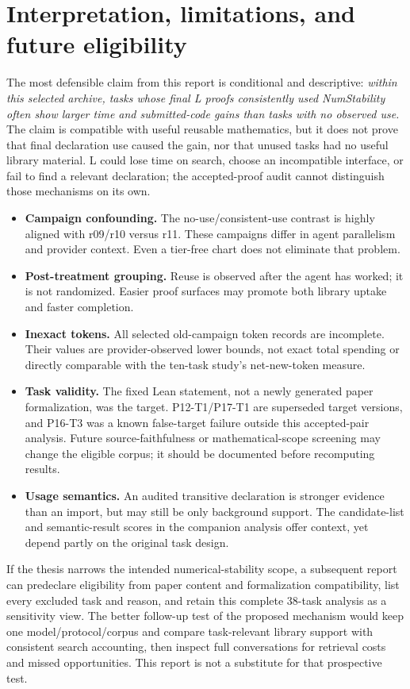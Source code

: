 \documentclass[10pt]{article}
\begin{document}
\clearpage
\section{Interpretation, limitations, and future eligibility}
The most defensible claim from this report is conditional and descriptive: \emph{within this selected archive, tasks whose final L proofs consistently used NumStability often show larger time and submitted-code gains than tasks with no observed use.} The claim is compatible with useful reusable mathematics, but it does not prove that final declaration use caused the gain, nor that unused tasks had no useful library material. L could lose time on search, choose an incompatible interface, or fail to find a relevant declaration; the accepted-proof audit cannot distinguish those mechanisms on its own.

\begin{itemize}
\item \textbf{Campaign confounding.} The no-use/consistent-use contrast is highly aligned with r09/r10 versus r11. These campaigns differ in agent parallelism and provider context. Even a tier-free chart does not eliminate that problem.
\item \textbf{Post-treatment grouping.} Reuse is observed after the agent has worked; it is not randomized. Easier proof surfaces may promote both library uptake and faster completion.
\item \textbf{Inexact tokens.} All selected old-campaign token records are incomplete. Their values are provider-observed lower bounds, not exact total spending or directly comparable with the ten-task study's net-new-token measure.
\item \textbf{Task validity.} The fixed Lean statement, not a newly generated paper formalization, was the target. P12-T1/P17-T1 are superseded target versions, and P16-T3 was a known false-target failure outside this accepted-pair analysis. Future source-faithfulness or mathematical-scope screening may change the eligible corpus; it should be documented before recomputing results.
\item \textbf{Usage semantics.} An audited transitive declaration is stronger evidence than an import, but may still be only background support. The candidate-list and semantic-result scores in the companion analysis offer context, yet depend partly on the original task design.
\end{itemize}

If the thesis narrows the intended numerical-stability scope, a subsequent report can predeclare eligibility from paper content and formalization compatibility, list every excluded task and reason, and retain this complete 38-task analysis as a sensitivity view. The better follow-up test of the proposed mechanism would keep one model/protocol/corpus and compare task-relevant library support with consistent search accounting, then inspect full conversations for retrieval costs and missed opportunities. This report is not a substitute for that prospective test.
\end{document}

